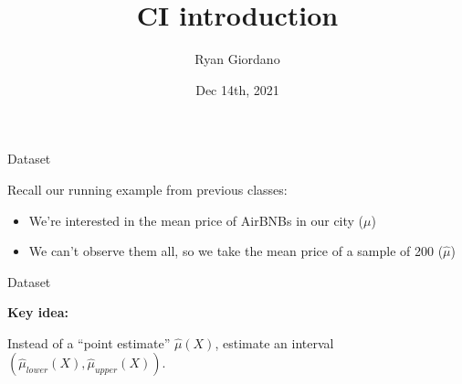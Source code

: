 \documentclass[8pt]{beamer}\usepackage[]{graphicx}\usepackage[]{color}
\title{CI introduction}
\author{Ryan Giordano}
\date{Dec 14th, 2021}
\institute{Massachusetts Institute of Technology}
\begin{document}

\begin{frame}[fragile]{Dataset}

Recall our running example from previous classes:\footnotemark[1]

\begin{itemize}
    \item We're interested in the mean price of AirBNBs in our city ($\mu$)
    \item We can't observe them all, so we take the mean
          price of a sample of 200 ($\hat\mu$)
\end{itemize}


\begin{center}
\begin{minipage}{0.9\textwidth}
\end{minipage}
\end{center}

\vfill
{}

\end{frame}





\begin{frame}[t, fragile]{Dataset}

\textbf{Key idea: }

Instead of a ``point estimate'' $\hat\mu(X)$,
estimate an interval $(\hat\mu_{lower}(X), \hat\mu_{upper}(X))$.



\begin{center}
\begin{minipage}{0.9\textwidth}
\end{minipage}
\end{center}

\end{frame}
\end{document}
